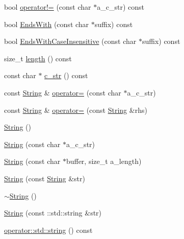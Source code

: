 \begin{DoxyCompactItemize}
\item 
bool \hyperlink{classtesting_1_1internal_1_1String_a7124fa063a9ec943dc2d1d85abee99c1}{operator!=} (const char $\ast$a\-\_\-c\-\_\-str) const 
\item 
bool \hyperlink{classtesting_1_1internal_1_1String_ad95186cd1bc0b0d6b482487057d8198e}{\-Ends\-With} (const char $\ast$suffix) const 
\item 
bool \hyperlink{classtesting_1_1internal_1_1String_a5d6a5d48da3213d93cb038ae045d06e3}{\-Ends\-With\-Case\-Insensitive} (const char $\ast$suffix) const 
\item 
size\-\_\-t \hyperlink{classtesting_1_1internal_1_1String_a2edf269e5cd490f7863c9150bb910c85}{length} () const 
\item 
const char $\ast$ \hyperlink{classtesting_1_1internal_1_1String_a89da6be964480b4c86334e4e337d3cf2}{c\-\_\-str} () const 
\item 
const \hyperlink{classtesting_1_1internal_1_1String}{\-String} \& \hyperlink{classtesting_1_1internal_1_1String_a110cff322a1833c1656928e12f433a36}{operator=} (const char $\ast$a\-\_\-c\-\_\-str)
\item 
const \hyperlink{classtesting_1_1internal_1_1String}{\-String} \& \hyperlink{classtesting_1_1internal_1_1String_aef28784c33be4941a4d09907d58dd946}{operator=} (const \hyperlink{classtesting_1_1internal_1_1String}{\-String} \&rhs)
\item 
\hyperlink{classtesting_1_1internal_1_1String_a8db865e64c3c3f65ec6a0b6fd8c09a94}{\-String} ()
\item 
\hyperlink{classtesting_1_1internal_1_1String_a09f57f38d35cb64db81a3e7bfefd6b0b}{\-String} (const char $\ast$a\-\_\-c\-\_\-str)
\item 
\hyperlink{classtesting_1_1internal_1_1String_af4ba9a07bb72590a666527e76f90e6f8}{\-String} (const char $\ast$buffer, size\-\_\-t a\-\_\-length)
\item 
\hyperlink{classtesting_1_1internal_1_1String_a326f0bd688ed2b378c3672cc93688e2e}{\-String} (const \hyperlink{classtesting_1_1internal_1_1String}{\-String} \&str)
\item 
\hyperlink{classtesting_1_1internal_1_1String_a998ab66c7adb23a76179eec57d05de9d}{$\sim$\-String} ()
\item 
\hyperlink{classtesting_1_1internal_1_1String_a81736a539597c8a4ca1f77187475a41b}{\-String} (const \-::std\-::string \&str)
\item 
\hyperlink{classtesting_1_1internal_1_1String_a079ba7a66275d60e382981eb7a421f82}{operator\-::std\-::string} () const 

\end{DoxyCompactItemize}
